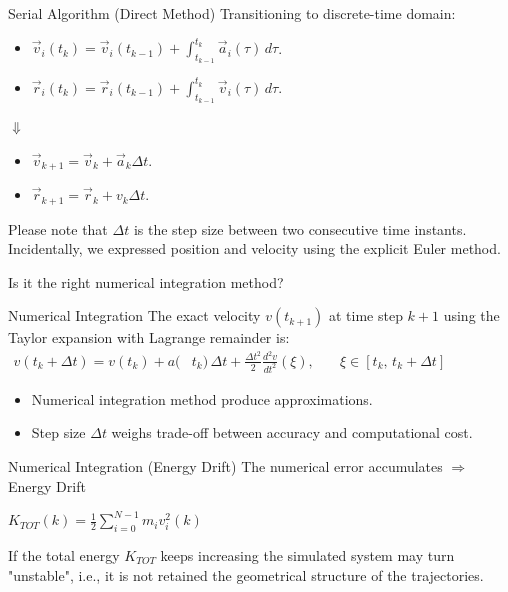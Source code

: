 \documentclass{beamer}
\begin{document}
\begin{frame}{Serial Algorithm (Direct Method)}
Transitioning to discrete-time domain:
\begin{itemize}
	\item $\vec{v}_i(t_k) = \vec{v}_i(t_{k-1}) + \int_{t_{k-1}}^{t_k} \vec{a}_i(\tau)\, d\tau$.
	\item $\vec{r}_i(t_k) = \vec{r}_i(t_{k-1}) + \int_{t_{k-1}}^{t_k} \vec{v}_i(\tau)\, d\tau$.
\end{itemize}
\begin{center}
$\Downarrow$
\end{center}
\begin{itemize}
	\item $\vec{v}_{k+1}=\vec{v}_k+\vec{a}_k\Delta t$.
	\item $\vec{r}_{k+1}=\vec{r}_k+{v}_k\Delta t$.
\end{itemize}
Please note that $\Delta t$ is the step size between two consecutive time instants.
Incidentally, we expressed position and velocity using the explicit Euler method.

Is it the right numerical integration method? 
\end{frame}

\begin{frame}{Numerical Integration}
The exact velocity $v(t_{k+1})$ at time step $k+1$ using the Taylor expansion with Lagrange remainder is:
$
\begin{aligned}
v(t_k+\Delta t) = v(t_k) + a(&t_k)\,\Delta t
+ \frac{\Delta t^2}{2} \frac{d^2 v}{dt^2}(\xi),
&\quad \xi \in \left[ t_k,\, t_k+\Delta t \right]
\end{aligned}
$
\begin{itemize}
	\item Numerical integration method produce approximations.
	\item Step size $\Delta t$ weighs trade-off between accuracy and computational cost. %
\end{itemize}
\end{frame}

\begin{frame}{Numerical Integration (Energy Drift)}
The numerical error accumulates $\Rightarrow$ Energy Drift \\[2ex]
\begin{center}
$K_{TOT}(k) = \frac{1}{2} \sum_{i=0}^{N-1}m_iv_i^2(k)$
\end{center}
If the total energy $K_{TOT}$ keeps increasing the simulated system %
may turn "unstable", i.e., it is not retained the geometrical structure of the trajectories.
\end{frame}
\end{document}
